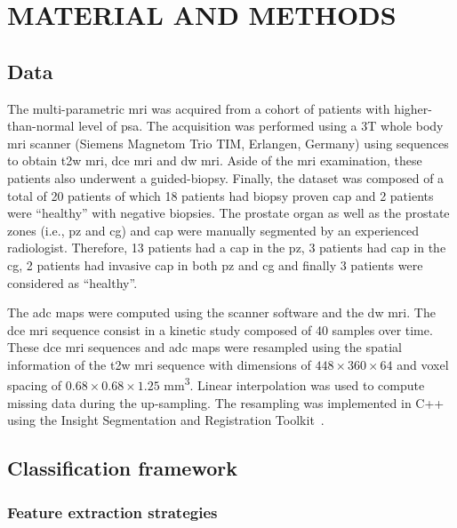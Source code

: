 \section{MATERIAL AND METHODS}\label{sec:methodology}

\subsection{Data}\label{subsec:data}

The multi-parametric \ac{mri} was acquired from a cohort of patients with higher-than-normal level of \ac{psa}. The acquisition was performed using a 3T whole body \ac{mri} scanner (Siemens Magnetom Trio TIM, Erlangen, Germany) using sequences to obtain \ac{t2w} \ac{mri}, \ac{dce} \ac{mri} and \ac{dw} \ac{mri}. Aside of the \ac{mri} examination, these patients also underwent a guided-biopsy. Finally, the dataset was composed of a total of 20 patients of which 18 patients had biopsy proven \ac{cap} and 2 patients were ``healthy'' with negative biopsies. The prostate organ as well as the prostate zones (i.e., \ac{pz} and \ac{cg}) and \ac{cap} were manually segmented by an experienced radiologist. Therefore, 13 patients had a \ac{cap} in the \ac{pz}, 3 patients had \ac{cap} in the \ac{cg}, 2 patients had invasive \ac{cap} in both \ac{pz} and \ac{cg} and finally 3 patients were considered as ``healthy''. 

The \ac{adc} maps were computed using the scanner software and the \ac{dw} \ac{mri}. The \ac{dce} \ac{mri} sequence consist in a kinetic study composed of 40 samples over time. These \ac{dce} \ac{mri} sequences and \ac{adc} maps were resampled using the spatial information of the \ac{t2w} \ac{mri} sequence with dimensions of $448 \times 360 \times 64$ and voxel spacing of $0.68 \times 0.68 \times 1.25 $ mm\textsuperscript{3}. Linear interpolation was used to compute missing data during the up-sampling. The resampling was implemented in C++ using the Insight Segmentation and Registration Toolkit~\cite{Johnson2013}.

\subsection{Classification framework}\label{subsec:classif}

\subsubsection{Feature extraction strategies}\label{subsubsec:featextr}

